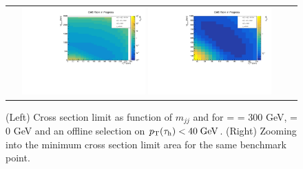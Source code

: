 \begin{figure}[tbh!]
	\centering
	\begin{tabular}{cc}
		\includegraphics[width=0.45\textwidth]{analysis/pics/JetInvMass_vs_MET_xsec_chi300_lsp000_taupt40.pdf}
		\includegraphics[width=0.45\textwidth]{analysis/pics/JetInvMass_vs_MET_xsec_chi300_lsp000_taupt40_zoom.pdf}
	\end{tabular}
	\caption{(Left) Cross section limit as function of $m_{jj}$ and \met for \charginopm = \neutralinotwo = 300 GeV, \neutralinoone = 0 GeV and an offline selection on $p_{\text{T}}(\tau_{\text{h}}) <  40\;\text{Ge}\kern-0.06667em\text{V}$. (Right) Zooming into the minimum cross section limit area for the same benchmark point.}
	\label{fig::JetInvMass_vs_MET_xsec_chi300_lsp000_taupt40}
\end{figure}

